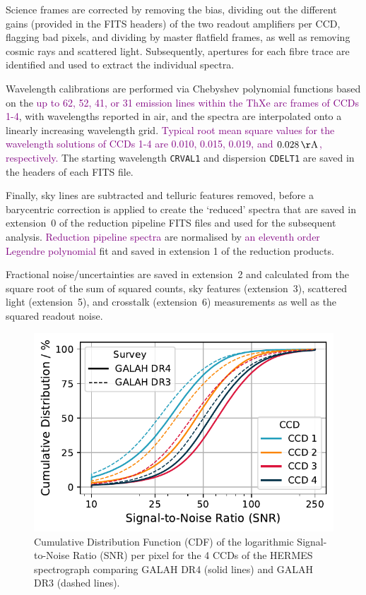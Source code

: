 \documentclass[
  journal=pasa,
  manuscript=research-paper, %
  year=2024,
  volume=37
]{cup-journal}
\newcommand{\adjusted}[1]{{\textcolor{purple}{#1}}}
\begin{document}
Science frames are corrected by removing the bias, dividing out the different gains (provided in the FITS headers) of the two readout amplifiers per CCD, flagging bad pixels, and dividing by master flatfield frames, as well as removing cosmic rays and scattered light. Subsequently, apertures for each fibre trace are identified and used to extract the individual spectra. 

Wavelength calibrations are performed via Chebyshev polynomial functions based on the \adjusted{up to 62, 52, 41, or 31 emission lines within the ThXe arc frames of CCDs 1-4}, with wavelengths reported in air, and the spectra are interpolated onto a linearly increasing wavelength grid. \adjusted{Typical root mean square values for the wavelength solutions of CCDs 1-4 are 0.010, 0.015, 0.019, and $0.028\,\mathrm{\AA}$, respectively.} The starting wavelength \texttt{CRVAL1} and dispersion \texttt{CDELT1} are saved in the headers of each FITS file.

Finally, sky lines are subtracted and telluric features removed, before a barycentric correction is applied to create the `reduced' spectra that are saved in extension~0 of the reduction pipeline FITS files and used for the subsequent analysis. \adjusted{Reduction pipeline spectra} are normalised by \adjusted{an eleventh order Legendre polynomial} fit and saved in extension 1 of the reduction products.

Fractional noise/uncertainties are saved in extension~2 and calculated from the square root of the sum of squared counts, sky features (extension~3), scattered light (extension~5), and crosstalk (extension~6) measurements as well as the squared readout noise.

\begin{figure}[ht]
    \centering
    \includegraphics[width=\columnwidth]{figures/snr_distribution.pdf}
    \caption{Cumulative Distribution Function (CDF) of the logarithmic Signal-to-Noise Ratio (SNR) per pixel for the 4 CCDs of the HERMES spectrograph comparing GALAH DR4 (solid lines) and GALAH DR3 (dashed lines).}
    \label{fig:snr_distribution}
\end{figure}
\end{document}
